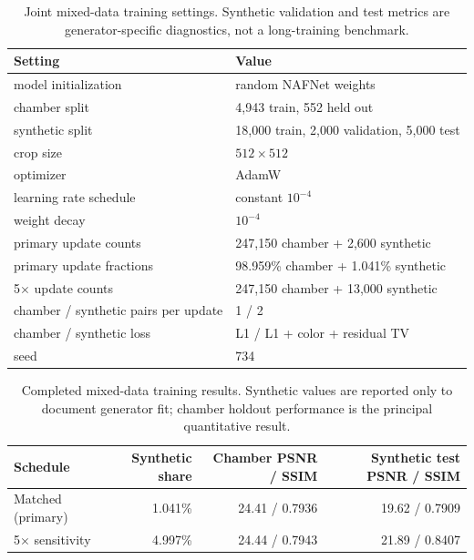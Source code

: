 \documentclass[9pt]{osa-supplemental-document}
\begin{document}
\begin{table}[htbp]
\centering
\small
\caption{Joint mixed-data training settings. Synthetic validation
and test metrics are generator-specific diagnostics, not a
long-training benchmark.}
\label{tabS:mixed_training}
\begin{tabular}{ll}
\toprule
\textbf{Setting} & \textbf{Value} \\
\midrule
model initialization & random NAFNet weights \\
chamber split & 4{,}943 train, 552 held out \\
synthetic split & 18{,}000 train, 2{,}000 validation, 5{,}000 test \\
crop size & $512\times512$ \\
optimizer & AdamW \\
learning rate schedule & constant $10^{-4}$ \\
weight decay & $10^{-4}$ \\
primary update counts & 247{,}150 chamber + 2{,}600 synthetic \\
primary update fractions & 98.959\% chamber + 1.041\% synthetic \\
5$\times$ update counts & 247{,}150 chamber + 13{,}000 synthetic \\
chamber / synthetic pairs per update & 1 / 2 \\
chamber / synthetic loss & L1 / L1 + color + residual TV \\
seed & 734 \\
\bottomrule
\end{tabular}
\end{table}

\begin{table}[htbp]
\centering
\scriptsize
\caption{Completed mixed-data training results. Synthetic values are
reported only to document generator fit; chamber holdout performance
is the principal quantitative result.}
\label{tabS:mixed_results}
\begin{tabular}{lrrr}
\toprule
\textbf{Schedule} & \textbf{Synthetic share} &
\textbf{Chamber PSNR / SSIM} &
\textbf{Synthetic test PSNR / SSIM} \\
\midrule
Matched (primary) & 1.041\% & 24.41 / 0.7936 & 19.62 / 0.7909 \\
5$\times$ sensitivity & 4.997\% & 24.44 / 0.7943 & 21.89 / 0.8407 \\
\bottomrule
\end{tabular}
\end{table}
\end{document}
